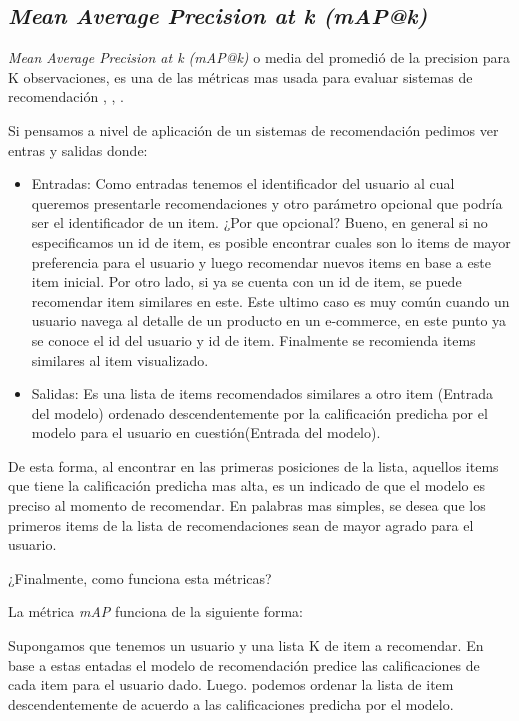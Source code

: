 \documentclass[11pt,a4paper,twoside]{thesis}
\begin{document}
{\subsection{\textit{Mean Average Precision at k (mAP@k)}}

\textit{Mean Average Precision at k (mAP@k)} o media del promedió de la precision para K observaciones, es una de las métricas mas usada para evaluar sistemas de recomendación \cite{map_at_k_1}, \cite{map_at_k_2}, \cite{map_at_k_3}.

Si pensamos a nivel de aplicación de un sistemas de recomendación pedimos ver entras y salidas donde:


\begin{itemize}
\item Entradas: Como entradas tenemos el identificador del usuario al cual queremos presentarle recomendaciones y otro parámetro opcional que podría ser el identificador de un item. ¿Por que opcional? Bueno, en general si no especificamos un id de item, es posible encontrar cuales son lo items de mayor preferencia para el usuario y luego recomendar nuevos items en base a este item inicial. Por otro lado, si ya se cuenta con un id de item, se puede recomendar item similares en este. Este ultimo caso es muy común cuando un usuario navega al detalle de un producto en un e-commerce, en este punto ya se conoce el id del usuario y id de item. Finalmente se recomienda items similares al item visualizado.
\item Salidas: Es una lista de items recomendados similares a otro item (Entrada del modelo) ordenado descendentemente por la calificación predicha por el modelo para el usuario en cuestión(Entrada del modelo). 
\end{itemize}


De esta forma, al encontrar en las primeras posiciones de la lista, aquellos items que tiene la calificación predicha mas alta, es un indicado de que el modelo es preciso al momento de recomendar. En palabras mas simples, se desea que los primeros items de la lista de recomendaciones sean de mayor agrado para el usuario.

¿Finalmente, como funciona esta métricas?

La métrica \textit{mAP\makeatletter@k} funciona de la siguiente forma:

Supongamos que tenemos un usuario y una lista K de item a recomendar. En base a estas entadas el modelo de recomendación predice las calificaciones de cada item para el usuario dado. Luego. podemos ordenar la lista de item descendentemente de acuerdo a las calificaciones predicha por el modelo.

}
\end{document}
